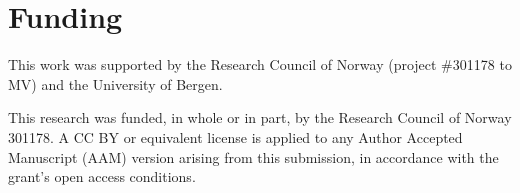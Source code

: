 \documentclass[]{article}
\begin{document}
\section*{Funding}

This work was supported by the Research Council of Norway (project \#301178 to MV) and the University of Bergen.

This research was funded, in whole or in part, by the Research Council of Norway 301178. A CC BY or equivalent license is applied to any Author Accepted Manuscript (AAM) version arising from this submission, in accordance with the grant’s open access conditions.





\end{document}
